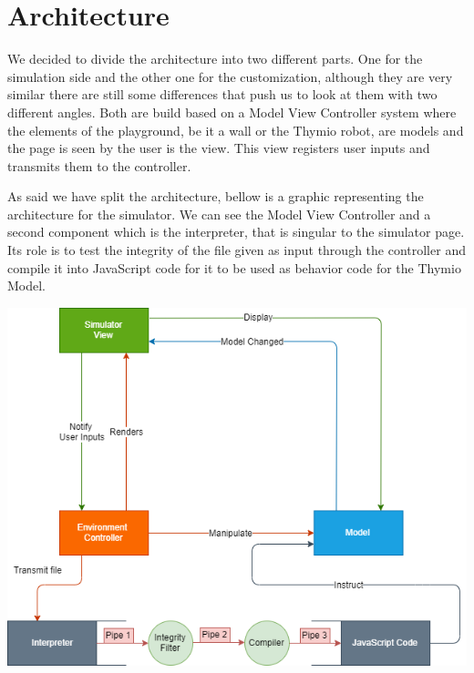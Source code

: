 \documentclass{scrbook}
\begin{document}

\chapter{Architecture}

We decided to divide the architecture into two different parts. One for the simulation side and the other one for the customization, although they are very similar there are still some differences that push us to look at them with two different angles. Both are build based on a Model View Controller system where the elements of the playground, be it a wall or the Thymio robot, are models and the page is seen by the user is the view. This view registers user inputs and transmits them to the controller. 

As said we have split the architecture, bellow is a graphic representing the architecture for the simulator. We can see the Model View Controller and a second component which is the interpreter, 
that is singular to the simulator page. Its role is to test the integrity of the file given as input through the controller and compile it into JavaScript code for it to be used as behavior code for the Thymio Model.

\begin{center}
  \includegraphics[width=\textwidth]{./architecture_proposal-Page-1}
\end{center}
\end{document}

